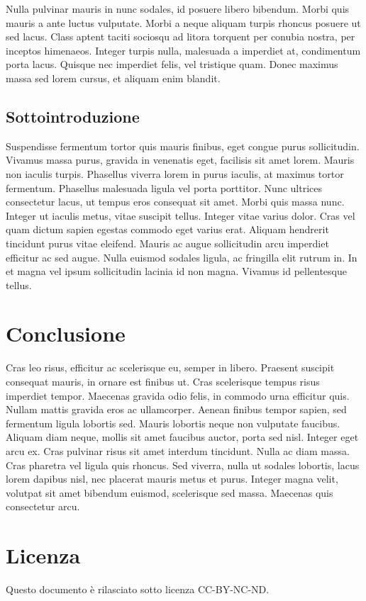 \documentclass[a4paper, 12pt]{article}
\begin{document}
Nulla pulvinar mauris in nunc sodales, id posuere libero bibendum. Morbi quis mauris a ante luctus vulputate. Morbi a neque aliquam turpis rhoncus posuere ut sed lacus. Class aptent taciti sociosqu ad litora torquent per conubia nostra, per inceptos himenaeos. Integer turpis nulla, malesuada a imperdiet at, condimentum porta lacus. Quisque nec imperdiet felis, vel tristique quam. Donec maximus massa sed lorem cursus, et aliquam enim blandit.

\subsection{Sottointroduzione}

Suspendisse fermentum tortor quis mauris finibus, eget congue purus sollicitudin. Vivamus massa purus, gravida in venenatis eget, facilisis sit amet lorem. Mauris non iaculis turpis. Phasellus viverra lorem in purus iaculis, at maximus tortor fermentum. Phasellus malesuada ligula vel porta porttitor. Nunc ultrices consectetur lacus, ut tempus eros consequat sit amet. Morbi quis massa nunc. Integer ut iaculis metus, vitae suscipit tellus. Integer vitae varius dolor. Cras vel quam dictum sapien egestas commodo eget varius erat. Aliquam hendrerit tincidunt purus vitae eleifend. Mauris ac augue sollicitudin arcu imperdiet efficitur ac sed augue. Nulla euismod sodales ligula, ac fringilla elit rutrum in. In et magna vel ipsum sollicitudin lacinia id non magna. Vivamus id pellentesque tellus.

\section{Conclusione}

Cras leo risus, efficitur ac scelerisque eu, semper in libero. Praesent suscipit consequat mauris, in ornare est finibus ut. Cras scelerisque tempus risus imperdiet tempor. Maecenas gravida odio felis, in commodo urna efficitur quis. Nullam mattis gravida eros ac ullamcorper. Aenean finibus tempor sapien, sed fermentum ligula lobortis sed. Mauris lobortis neque non vulputate faucibus. Aliquam diam neque, mollis sit amet faucibus auctor, porta sed nisl. Integer eget arcu ex. Cras pulvinar risus sit amet interdum tincidunt. Nulla ac diam massa. Cras pharetra vel ligula quis rhoncus. Sed viverra, nulla ut sodales lobortis, lacus lorem dapibus nisl, nec placerat mauris metus et purus. Integer magna velit, volutpat sit amet bibendum euismod, scelerisque sed massa. Maecenas quis consectetur arcu.

\nocite{*}

\printbibliography 

\section*{Licenza}

Questo documento è rilasciato sotto licenza CC-BY-NC-ND. \ccbyncnd
\end{document}
